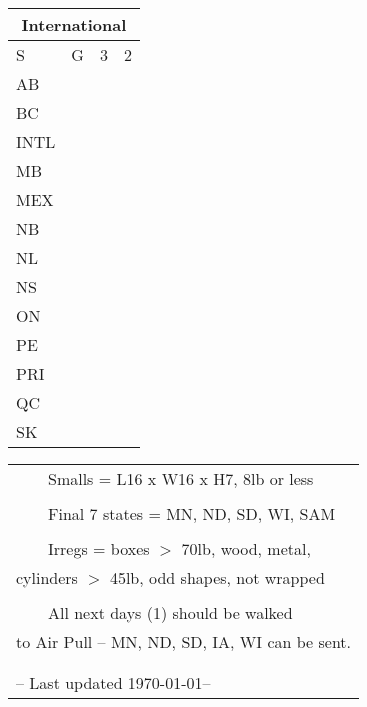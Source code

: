 \documentclass[twocolumn]{article}
\newcommand{\tabitem}{~~\llap{\textbullet}~~}
\begin{document}
\small{}
\begin{tabular}[t]{@{}ll|l|l@{}}
\multicolumn{4}{c}{\textbf{International}}                               \\ 
\toprule
S    & G                  & 3                & 2                \\ \midrule
AB   & \cellcolor{blue}   & \cellcolor{blue} & \cellcolor{blue} \\
BC   & \cellcolor{yellow} &                  & \cellcolor{blue} \\
INTL & \cellcolor{blue}   & \cellcolor{blue} & \cellcolor{blue} \\
MB   & \cellcolor{blue}   & \cellcolor{blue} & \cellcolor{blue} \\
MEX  & \cellcolor{blue}   & \cellcolor{blue} & \cellcolor{blue} \\
NB   & \cellcolor{red}    &                  & \cellcolor{blue} \\
NL   & \cellcolor{red}    &                  & \cellcolor{blue} \\
NS   & \cellcolor{red}    &                  & \cellcolor{blue} \\
ON   & \cellcolor{purple} &                  & \cellcolor{blue} \\
PE   & \cellcolor{red}    &                  & \cellcolor{blue} \\
PRI  & \cellcolor{orange} & \cellcolor{blue} & \cellcolor{blue} \\
QC   & \cellcolor{red}    &                  & \cellcolor{blue} \\
SK   & \cellcolor{blue}   & \cellcolor{blue} & \cellcolor{blue} \\ \bottomrule
\end{tabular}
\hspace{1em}
\large{}
\begin{tabular}[t]{l}
\tabitem Smalls = L16 x W16 x H7, 8lb or less  \\
\\
\tabitem Final 7 states = MN, ND, SD, WI, SAM  \\
\\
\tabitem Irregs = boxes $>$ 70lb, wood, metal, \\
cylinders $>$ 45lb, odd shapes, not wrapped  \\
\\
\tabitem All next days (1) should be walked \\
to Air Pull -- MN, ND, SD, IA, WI can be sent. \\
\\
\\
-- Last updated \today -- \\
\end{tabular}
\end{document}
